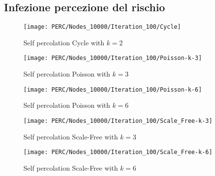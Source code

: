 \subsection{Infezione percezione del rischio}\label{subsec:app-infezione-con-la-percezione-del-rischio}
    \begin{figure}[H]
        \texttt{[image: PERC/Nodes\_10000/Iteration\_100/Cycle]}\caption{Self percolation Cycle with $k=2$}
        \label{fig:perc_cycle}
    \end{figure}
    \begin{figure}[H]
        \texttt{[image: PERC/Nodes\_10000/Iteration\_100/Poisson-k-3]}\caption{Self percolation Poisson with $k=3$}
        \label{fig:perc_poisson_k_3}
    \end{figure}
    \begin{figure}[H]
        \texttt{[image: PERC/Nodes\_10000/Iteration\_100/Poisson-k-6]}\caption{Self percolation Poisson with $k=6$}
        \label{fig:perc_poisson_k_6}
    \end{figure}
    \begin{figure}[H]
        \texttt{[image: PERC/Nodes\_10000/Iteration\_100/Scale\_Free-k-3]}\caption{Self percolation Scale-Free with $k=3$}
        \label{fig:perc_scale_free_k_3}
    \end{figure}
    \begin{figure}[H]
        \texttt{[image: PERC/Nodes\_10000/Iteration\_100/Scale\_Free-k-6]}\caption{Self percolation Scale-Free with $k=6$}
        \label{fig:perc_scale_free_k_6}
    \end{figure}

